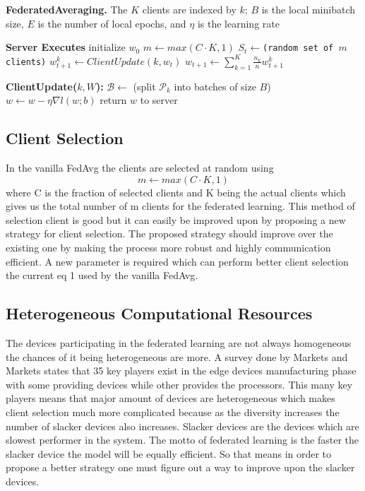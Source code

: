 \documentclass[conference]{IEEEtran}
\begin{document}
\begin{algorithm}
	\caption{\textbf{FederatedAveraging.} The $K$ clients are
		indexed by $k$; $B$ is the local minibatch size, $E$ is the number
		of local epochs, and $\eta$ is the learning rate}\label{alg:cap}
	\begin{algorithmic}[1]
		\State \textbf{Server Executes}
		\State initialize $w_0$
		\State \texttt{$m \gets max(C\cdot K,1)$}
		\State \texttt{$S_t \gets $(random set of $m$ clients)}
		\State $w_{t+1}^{k} \gets ClientUpdate(k,w_t)$
		\EndFor
		\State $w_{t+1} \gets \sum_{k=1}^{K} \frac{n_k}{n} w_{t+1}^{k}$
		
		\EndFor
		\State
		\State \textbf{ClientUpdate($k,W$):} 
		\State $\mathcal{B} \gets$ (split $\mathcal{P}_k$ into batches of size $B$)
		\State $w \gets w - \eta \nabla l(w;b)$
		\EndFor
		\EndFor
		\State return $w$ to server
		
	\end{algorithmic}
\end{algorithm}

\subsection{Client Selection}

In the vanilla FedAvg the clients are selected at random using 
\begin{equation}
 m \gets max(C\cdot K,1)
 \end{equation}
 where C is the fraction of selected clients and K being the actual clients which gives us the total number of m clients for the federated learning. This method of selection client is good but it can easily be improved upon by proposing a new strategy for client selection. The proposed strategy should improve over the existing one by making the process more robust and highly communication efficient. A new parameter is required which can perform better client selection the current eq 1 used by the vanilla FedAvg.   

\subsection{Heterogeneous Computational Resources}
The devices participating in the federated learning are not always homogeneous the chances of it being heterogeneous are more. A survey done by Markets and Markets \cite{market} states that 35 key players exist in the edge devices manufacturing phase with some providing devices while other provides the processors. This many key players means that major amount of devices are heterogeneous which makes client selection much more complicated because as the diversity increases the number of slacker devices also increases. Slacker devices are the devices which are slowest performer in the system. The motto of federated learning is the faster the slacker device the model will be equally efficient. So that means in order to propose a better strategy one must figure out a way to improve upon the slacker devices. 
\end{document}
